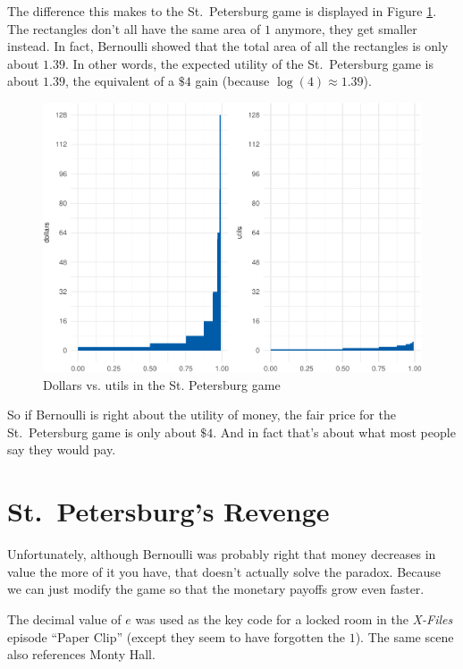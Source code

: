 \documentclass[justified]{tufte-book}
\theoremstyle{definition}
\theoremstyle{definition}
\theoremstyle{definition}
\theoremstyle{definition}
\theoremstyle{remark}
\begin{document}
The difference this makes to the St.~Petersburg game is displayed in Figure \ref{fig:logstp}. The rectangles don't all have the same area of \(1\) anymore, they get smaller instead. In fact, Bernoulli showed that the total area of all the rectangles is only about \(1.39\). In other words, the expected utility of the St.~Petersburg game is about \(1.39\), the equivalent of a \(\$4\) gain (because \(\log(4) \approx 1.39\)).

\begin{figure}
\includegraphics{_main_files/figure-latex/logstp-1} \caption[Dollars vs]{Dollars vs. utils in the St. Petersburg game}\label{fig:logstp}
\end{figure}

So if Bernoulli is right about the utility of money, the fair price for the St.~Petersburg game is only about \(\$4\). And in fact that's about what most people say they would pay.

\hypertarget{st.-petersburgs-revenge}{%
\section{St.~Petersburg's Revenge}\label{st.-petersburgs-revenge}}

Unfortunately, although Bernoulli was probably right that money decreases in value the more of it you have, that doesn't actually solve the paradox. Because we can just modify the game so that the monetary payoffs grow even faster.

\begin{marginfigure}
The decimal value of \(e\) was used as the key code for a locked room in
the \emph{X-Files} episode ``Paper Clip'' (except they seem to have
forgotten the \(1\)). The same scene also references Monty Hall.
\end{marginfigure}
\end{document}
